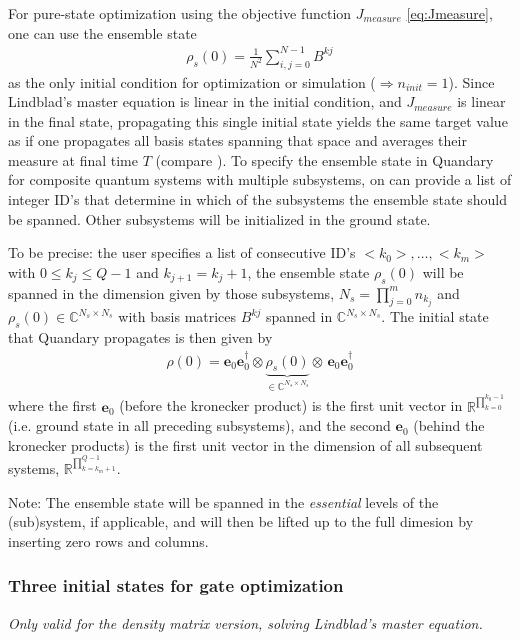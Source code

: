 \documentclass[11pt]{article}
\newcommand{\R}{\mathds{R}}
\newcommand{\C}{\mathds{C}}
\newcommand{\bs}[1]{{\boldsymbol{#1}}}
\begin{document}
For pure-state optimization using the objective function $J_{measure}$ \eqref{eq:Jmeasure}, one can use the ensemble state 
\begin{align}\label{eq:ensemblestate}
  \rho_s(0) = \frac{1}{N^2}\sum_{i,j=0}^{N-1} B^{kj}
\end{align}
as the only initial condition for optimization or simulation ($\Rightarrow n_{init}=1$). Since Lindblad's master equation is linear in the initial condition, and $J_{measure}$ is linear in the final state, propagating this single initial state yields the same target value as if one propagates all basis states spanning that space and averages their measure at final time $T$ (compare \cite{guenther2021quantum}). To specify the ensemble state in Quandary for composite quantum systems with multiple subsystems, on can provide a list of integer ID's that determine in which of the subsystems the ensemble state should be spanned. Other subsystems will be initialized in the ground state. 

To be precise: the user specifies a list of consecutive ID's $<k_0>, \dots, <k_m>$ with $0 \leq k_j \leq Q-1$ and $k_{j+1} = k_j+1$, the ensemble state $\rho_s(0)$ will be spanned in the dimension given by those subsystems, $N_s = \prod_{j=0}^{m} n_{k_j}$ and $\rho_s(0) \in \C^{N_s\times N_s}$ with basis matrices $B^{kj}$ spanned in $\C^{N_s\times N_s}$. The initial state that Quandary propagates is then given by 
\begin{align}
  \rho(0) = \bs{e}_0\bs{e}_0^\dagger \otimes \underbrace{\rho_s(0)}_{\in \C^{N_s\times N_s}} \otimes \, \bs{e}_0 \bs{e}_0^\dagger
\end{align}
where the first $\bs{e}_0$ (before the kronecker product) is the first unit vector in $\R^{\prod_{k=0}^{k_0-1}}$ (i.e. ground state in all preceding subsystems), and the second $\bs{e}_0$ (behind the kronecker products) is the first unit vector in the dimension of all subsequent systems, $\R^{\prod_{k=k_m+1}^{Q-1}}$. 

Note: The ensemble state will be spanned in the \textit{essential} levels of the (sub)system, if applicable, and will then be lifted up to the full dimesion by inserting zero rows and columns. 

\subsubsection{Three initial states for gate optimization}\label{subsec:threeinitcond}
\textit{Only valid for the density matrix version, solving Lindblad's master equation.}
\end{document}

